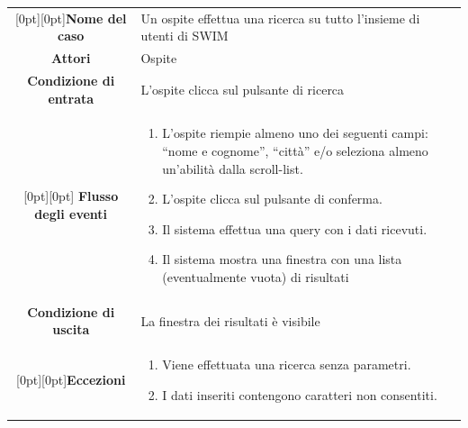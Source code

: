 \documentclass[a4paper,12pt]{article}
\begin{document}
\begin{tabularx}{\textwidth}{|c|X|}
\rowcolor[gray]{.9}\hline  \raisebox{-1ex}[0pt][0pt]{\textbf{Nome del caso}} & Un ospite effettua una ricerca su tutto l'insieme di utenti di SWIM \\
\rowcolor[gray]{.9}\hline  \textbf{Attori} & Ospite \\ 
\rowcolor[gray]{.9}\hline  \textbf{Condizione di entrata} & L'ospite clicca sul pulsante di ricerca \\
\rowcolor[gray]{.9}\hline \raisebox{-10ex}[0pt][0pt]{ \textbf{Flusso degli eventi}} & 
\begin{enumerate}
\itemsep0em 
\item L'ospite riempie almeno uno dei seguenti campi: “nome e cognome”, “città” e/o seleziona almeno un'abilità dalla scroll-list.
\item L'ospite clicca sul pulsante di conferma.
\item Il sistema effettua una query con i dati ricevuti.
\item Il sistema mostra una finestra con una lista (eventualmente vuota) di risultati
\end{enumerate}
 \\ 
\rowcolor[gray]{.9}\hline  \textbf{Condizione di uscita} & La finestra dei risultati è visibile \\
\rowcolor[gray]{.9}\hline  \raisebox{-4ex}[0pt][0pt]{\textbf{Eccezioni} }&
\begin{enumerate}
\itemsep0em
\item Viene effettuata una ricerca senza parametri.
\item I dati inseriti contengono caratteri non consentiti.
\end{enumerate}
\\
\hline 
\end{tabularx} \\[2\baselineskip]
\end{document}
